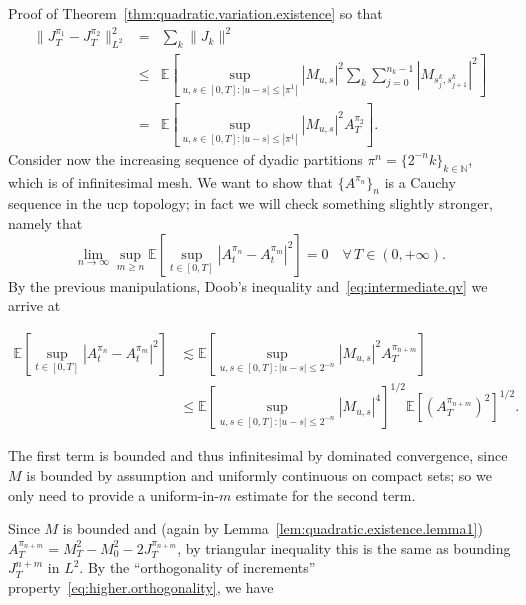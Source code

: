 \documentclass{article}
\newcommand{\textbf}[1]{\text{{\bfseries{#1}}}}
\newenvironment{proof*}[1]{\noindent\textbf{#1\ }}{\hspace*{\fill}$\Box$\medskip}
\newcommand{\1}{\1}
\begin{document}
{\begin{proof*}{Proof of Theorem~\ref{thm:quadratic.variation.existence}}
  so that
  \begin{eqnarray}
    \| J^{\pi_1}_T - J^{\pi_2}_T \|_{L^2}^2 & = & \sum_k \| J_k \|^2
    \nonumber\\
    & \leqslant & \mathbb{E} \left[ \sup_{u, s \in [0, T] : | u - s |
    \leqslant | \pi^1 |}   | M_{u, s} |^2  \sum_k \sum_{j = 0}^{n_k - 1} |
    M_{s^k_j, s^k_{j + 1}} |^2 \right] \nonumber\\
    & = & \mathbb{E} [\sup_{u, s \in [0, T] : | u - s | \leqslant | \pi^1 |} 
    | M_{u, s} |^2 A^{\pi_2}_T] .  \label{eq:intermediate.qv}
  \end{eqnarray}
  \textbf{{\hspace{1.5em}}Step 3.} Consider now the increasing sequence of
  dyadic partitions $\pi^n = \{ 2^{- n} k \}_{k \in \mathbb{N}}$, which is of
  infinitesimal mesh. We want to show that $\{ A^{\pi_n} \}_n$ is a Cauchy
  sequence in the ucp topology; in fact we will check something slightly
  stronger, namely that
  \begin{equation}
    \lim_{n \rightarrow \infty} \sup_{m \geqslant n} \mathbb{E} [\sup_{t \in
    [0, T]} | A^{\pi_n}_t - A^{\pi_m}_t |^2] = 0 \quad \forall \, T \in (0, +
    \infty) . \label{eq:intermediate.qv.goal}
  \end{equation}
  By the previous manipulations, Doob's inequality
  and~\eqref{eq:intermediate.qv} we arrive at
  
  \begin{align*}
    \mathbb{E} [\sup_{t \in [0, T]} | A^{\pi_n}_t - A^{\pi_m}_t |^2] &
    \lesssim \mathbb{E} [\sup_{u, s \in [0, T] : | u - s | \leqslant 2^{- n}} 
    | M_{u, s} |^2 A^{\pi_{n + m}}_T]\\
    & \leqslant \mathbb{E} [\sup_{u, s \in [0, T] : | u - s | \leqslant 2^{-
    n}}   | M_{u, s} |^4]^{1 / 2} \mathbb{E} [ (A^{\pi_{n + m}}_T)^2]^{1 / 2}
    .
  \end{align*}
  
  The first term is bounded and thus infinitesimal by dominated convergence,
  since $M$ is bounded by assumption and uniformly continuous on compact sets;
  so we only need to provide a uniform-in-$m$ estimate for the second term.
  
  Since $M$ is bounded and (again by
  Lemma~\ref{lem:quadratic.existence.lemma1}) $A^{\pi_{n + m}}_T = M^2_T -
  M^2_0 - 2 J^{\pi_{n + m}}_T$, by triangular inequality this is the same as
  bounding $J^{n + m}_T$ in $L^2$. By the ``orthogonality of increments''
  property~\eqref{eq:higher.orthogonality}, we have
  

\end{proof*}}
\end{document}
